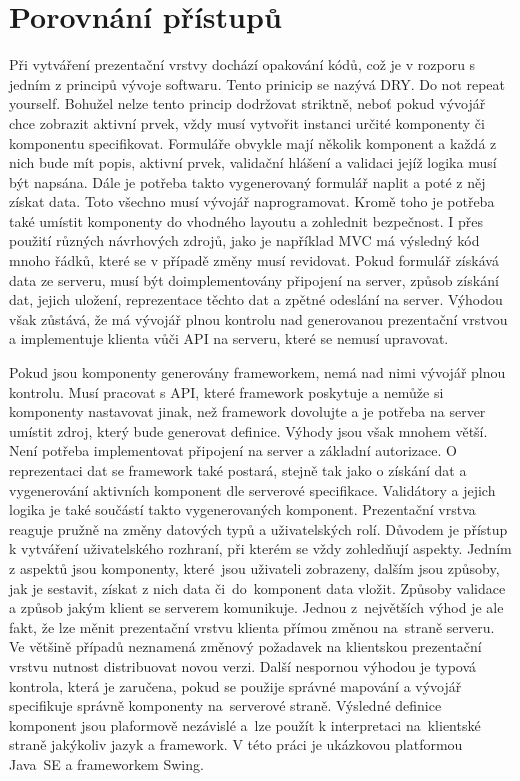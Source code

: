\section{Porovnání přístupů}
Při vytváření prezentační vrstvy dochází opakování kódů, což je v rozporu s jedním z principů vývoje softwaru. Tento prinicip se nazývá DRY. Do not repeat yourself. Bohužel nelze tento princip dodržovat striktně, neboť pokud vývojář chce zobrazit aktivní prvek, vždy musí vytvořit instanci určité komponenty či komponentu specifikovat. Formuláře obvykle mají několik komponent a každá z nich bude mít popis, aktivní prvek, validační hlášení a validaci jejíž logika musí být napsána. Dále je potřeba takto vygenerovaný formulář naplit a poté z něj získat data. Toto všechno musí vývojář naprogramovat. Kromě toho je potřeba také umístit komponenty do vhodného layoutu a zohlednit bezpečnost. I přes použití různých návrhových zdrojů, jako je například MVC \cite{fowler} má výsledný kód mnoho řádků, které se v případě změny musí revidovat. Pokud formulář získává data ze serveru, musí být doimplementovány připojení na server, způsob získání dat, jejich uložení, reprezentace těchto dat a zpětné odeslání na server. Výhodou však zůstává, že má vývojář plnou kontrolu nad generovanou prezentační vrstvou a implementuje klienta vůči API na serveru, které se nemusí upravovat.

Pokud jsou komponenty generovány frameworkem, nemá nad nimi vývojář plnou kontrolu. Musí pracovat s API, které framework poskytuje a nemůže si komponenty nastavovat jinak, než framework dovolujte a je potřeba na server umístit zdroj, který bude generovat definice. Výhody jsou však mnohem větší. Není potřeba implementovat připojení na server a základní autorizace. O reprezentaci dat se framework také postará, stejně tak jako o získání dat a vygenerování aktivních komponent dle serverové specifikace. Validátory a jejich logika je také součástí takto vygenerovaných komponent. Prezentační vrstva reaguje pružně na změny datových typů a uživatelských rolí. Důvodem je přístup k vytváření uživatelského rozhraní, při kterém se vždy zohledňují aspekty. Jedním z aspektů jsou komponenty, které~jsou uživateli zobrazeny, dalším jsou způsoby, jak je sestavit, získat z nich data či~do~komponent data vložit. Způsoby validace a způsob jakým klient se serverem komunikuje. Jednou z~největších výhod je ale fakt, že lze měnit prezentační vrstvu klienta přímou změnou na~straně serveru. Ve většině případů neznamená změnový požadavek na klientskou prezentační vrstvu nutnost distribuovat novou verzi. Další nespornou výhodou je typová kontrola, která je zaručena, pokud se použije správné mapování a vývojář specifikuje správně komponenty na~serverové straně. Výsledné definice komponent jsou plaformově nezávislé a~lze použít k interpretaci na~klientské straně jakýkoliv jazyk a framework. V této práci je ukázkovou platformou Java~SE a frameworkem Swing.

